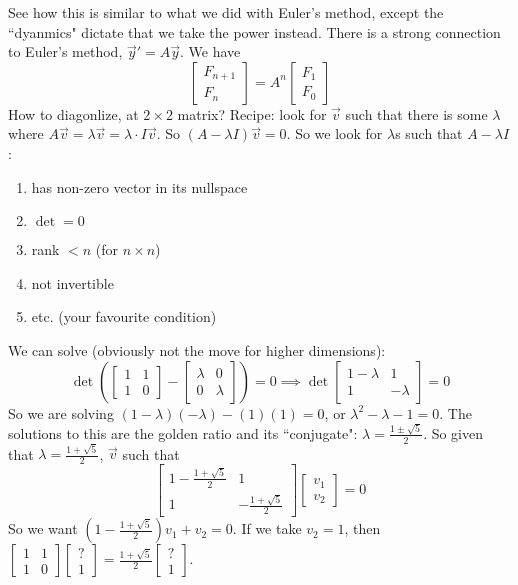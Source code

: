 \documentclass{article}
\theoremstyle{plain}
\theoremstyle{remark}
\begin{document}
See how this is similar to what we did with Euler's method,
except the ``dyanmics" dictate that we take the power instead.
There is a strong connection to Euler's method,
$\vec{y}' = A\vec{y}$.
We have
\[
	\begin{bmatrix} F_{n+1} \\ F_n \end{bmatrix}
	= A^n \begin{bmatrix} F_1 \\ F_0 \end{bmatrix}
\]
How to diagonlize, at $2\times 2$ matrix?
Recipe: look for $\vec{v}$ such that there is some $\lambda$
where $A\vec{v} = \lambda\vec{v} = \lambda \cdot I \vec{v}$.
So $(A - \lambda I)\vec{v} = 0$.
So we look for $\lambda$s such that $A - \lambda I$:
\begin{enumerate}
	\item has non-zero vector in its nullspace
	\item $\det = 0$
	\item rank $< n$ (for $n\times n$)
	\item not invertible
	\item etc. (your favourite condition)
\end{enumerate}

We can solve (obviously not the move for higher dimensions):
\[
	\det\left(\begin{bmatrix} 1 & 1 \\ 1 & 0 \end{bmatrix}
		- \begin{bmatrix} \lambda & 0 \\ 0 & \lambda \end{bmatrix}\right) = 0
	\implies \det\begin{bmatrix} 1 - \lambda & 1 \\ 1 & - \lambda \end{bmatrix} = 0
\]
So we are solving $(1 - \lambda)(-\lambda) - (1)(1) = 0$,
or $\lambda^2 - \lambda - 1 = 0$.
The solutions to this are the golden ratio and its ``conjugate":
$\lambda = \frac{1 \pm \sqrt{5}}{2}$.
So given that $\lambda = \frac{1+\sqrt{5}}{2}$, $\vec{v}$ such that
\[
	\begin{bmatrix} 1 - \frac{1+\sqrt{5}}{2} & 1\\
		1 & -\frac{1+\sqrt{5}}{2}\end{bmatrix} \begin{bmatrix} v_1 \\ v_2 \end{bmatrix}
		= 0
\]
So we want $(1 - \frac{1+\sqrt{5}}{2})v_1 + v_2 = 0$.
If we take $v_2 = 1$, then $\begin{bmatrix} 1 & 1 \\ 1 & 0 \end{bmatrix}
\begin{bmatrix} ? \\ 1 \end{bmatrix}
= \frac{1 + \sqrt{5}}{2}\begin{bmatrix} ? \\ 1 \end{bmatrix}$.
\end{document}
